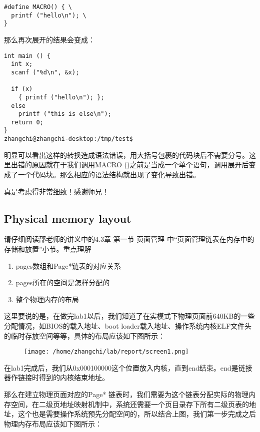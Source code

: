 \documentclass{article}
\newcommand{\funcname}[1]{{\ttfamily \small #1}}
\begin{document}
\begin{CJK*}{UTF8}{gkai}
\begin{lstlisting}[style=ccode, title={\scriptsize \ttfamily \bfseries test.c}]
#define MACRO() { \
  printf ("hello\n"); \
}
\end{lstlisting}

那么再次展开的结果会变成：


\begin{lstlisting}[style=console]
int main () {
  int x;
  scanf ("%d\n", &x);

  if (x)
    { printf ("hello\n"); };
  else
    printf ("this is else\n");
  return 0;
}
zhangchi@zhangchi-desktop:/tmp/test$ 
\end{lstlisting}

明显可以看出这样的转换造成语法错误，用大括号包裹的代码块后不需要分号。这里出错的原因就在于我们调用\funcname{MACRO ()}之前是当成一个单个语句，调用展开后变成了一个代码块。那么相应的语法结构就出现了变化导致出错。

真是考虑得非常细致！感谢师兄！

\subsection{Physical memory layout}

请仔细阅读邵老师的讲义中的4.3章 第一节 页面管理 中``页面管理链表在内存中的存储和放置''小节。重点理解

\begin{enumerate}
\item{pages数组和Page*链表的对应关系}
\item{pages所在的空间是怎样分配的}
\item{整个物理内存的布局}
\end{enumerate}

这里要说的是，在做完lab1以后，我们知道了在实模式下物理页面前640KB的一些分配情况，如BIOS的载入地址、boot loader载入地址、操作系统内核ELF文件头的临时存放空间等等，具体的布局应该如下图所示：

\begin{figure}[htp]
\centering
\texttt{[image: /home/zhangchi/lab/report/screen1.png]}
\end{figure}

在lab1完成后，我们从0x000100000这个位置放入内核，直到end结束。end是链接器作链接时得到的内核结束地址。

那么在建立物理页面对应的Page* 链表时，我们需要为这个链表分配实际的物理内存空间，在二级页地址映射机制中，系统还需要一个页目录存下所有二级页表的地址，这个也是需要操作系统预先分配空间的，所以结合上图，我们第一步完成之后物理内存布局应该如下图所示：



\end{CJK*}
\end{document}
